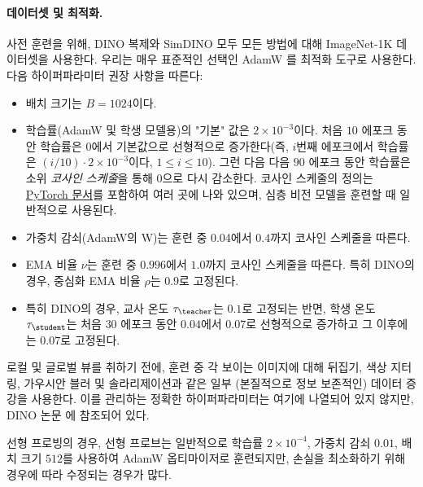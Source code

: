 \documentclass[../../book-main_ko.tex]{subfiles}
\begin{document}
\paragraph{데이터셋 및 최적화.} 사전 훈련을 위해, DINO 복제와 SimDINO 모두 모든 방법에 대해 ImageNet-1K 데이터셋을 사용한다. 우리는 매우 표준적인 선택인 AdamW \citep{Loshchilov2017DecoupledWD}를 최적화 도구로 사용한다. 다음 하이퍼파라미터 권장 사항을 따른다:
\begin{itemize}
    \item 배치 크기는 \(B = 1024\)이다.
    \item 학습률(AdamW 및 학생 모델용)의 "기본" 값은 \(2 \times 10^{-3}\)이다. 처음 \(10\) 에포크 동안 학습률은 \(0\)에서 기본값으로 선형적으로 증가한다(즉, \(i\)번째 에포크에서 학습률은 \((i/10) \cdot 2 \times 10^{-3}\)이다, \(1 \leq i \leq 10\)). 그런 다음 다음 \(90\) 에포크 동안 학습률은 소위 \textit{코사인 스케줄}을 통해 \(0\)으로 다시 감소한다. 코사인 스케줄의 정의는 \href{https://pytorch.org/docs/stable/generated/torch.optim.lr_scheduler.CosineAnnealingLR.html}{PyTorch 문서}를 포함하여 여러 곳에 나와 있으며, 심층 비전 모델을 훈련할 때 일반적으로 사용된다.
    \item 가중치 감쇠(AdamW의 W)는 훈련 중 0.04에서 \(0.4\)까지 코사인 스케줄을 따른다.
    \item EMA 비율 \(\nu\)는 훈련 중 \(0.996\)에서 \(1.0\)까지 코사인 스케줄을 따른다. 특히 DINO의 경우, 중심화 EMA 비율 \(\rho\)는 \(0.9\)로 고정된다.
    \item 특히 DINO의 경우, 교사 온도 \(\tau_{\teacher}\)는 \(0.1\)로 고정되는 반면, 학생 온도 \(\tau_{\student}\)는 처음 \(30\) 에포크 동안 \(0.04\)에서 \(0.07\)로 선형적으로 증가하고 그 이후에는 \(0.07\)로 고정된다.
\end{itemize}
로컬 및 글로벌 뷰를 취하기 전에, 훈련 중 각 보이는 이미지에 대해 뒤집기, 색상 지터링, 가우시안 블러 및 솔라리제이션과 같은 일부 (본질적으로 정보 보존적인) 데이터 증강을 사용한다. 이를 관리하는 정확한 하이퍼파라미터는 여기에 나열되어 있지 않지만, DINO 논문 \citep{caron2021emerging}에 참조되어 있다.

선형 프로빙의 경우, 선형 프로브는 일반적으로 학습률 \(2 \times 10^{-4}\), 가중치 감쇠 \(0.01\), 배치 크기 \(512\)를 사용하여 AdamW 옵티마이저로 훈련되지만, 손실을 최소화하기 위해 경우에 따라 수정되는 경우가 많다.
\end{document}
